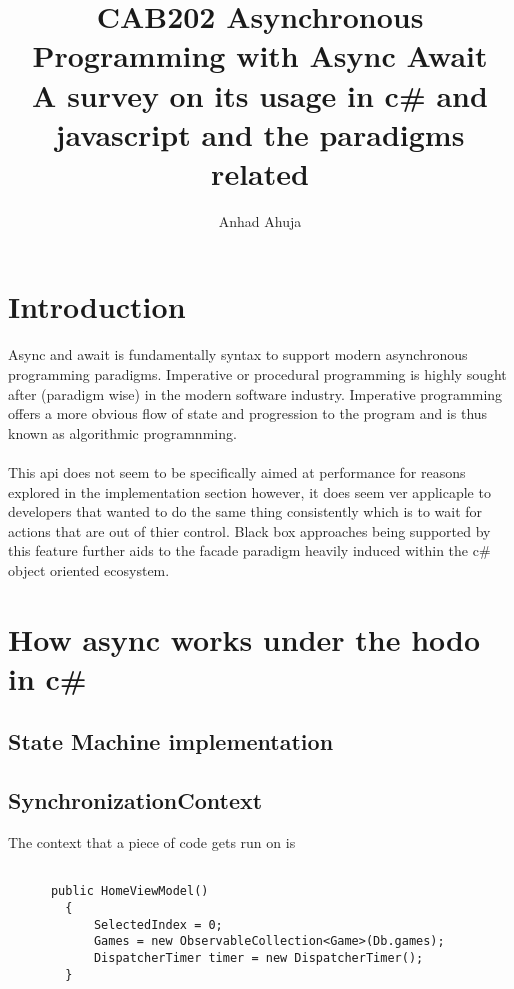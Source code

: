 \documentclass{article}
\title{CAB202 Asynchronous Programming with Async Await
\\\large A survey on its usage in c\# and javascript and the paradigms related}
\author{Anhad Ahuja}
\begin{document}
\maketitle



\section{Introduction}
Async and await is fundamentally syntax to support modern asynchronous programming paradigms.
Imperative or procedural programming is highly sought after (paradigm wise) in the modern software industry. 
Imperative programming offers a more obvious flow of state and progression to the program and is thus known as 
algorithmic programnming. \\ \\
This api does not seem to be specifically aimed at performance for reasons explored in the implementation section
however, it does seem ver applicaple to developers that wanted to do the same thing consistently 
which is to wait for actions that are out of thier control. 
Black box approaches being supported by this feature further aids to the facade paradigm heavily induced 
within the c\# object oriented ecosystem. 





\newpage

\section{How async works under the hodo in c\#}
\subsection{State Machine implementation}

\subsection{SynchronizationContext}
The context that a piece of code gets run on is

\begin{lstlisting}[language={[Sharp]C}]

      public HomeViewModel()
        {
            SelectedIndex = 0;
            Games = new ObservableCollection<Game>(Db.games);
            DispatcherTimer timer = new DispatcherTimer();
        }
\end{lstlisting}
\end{document}
